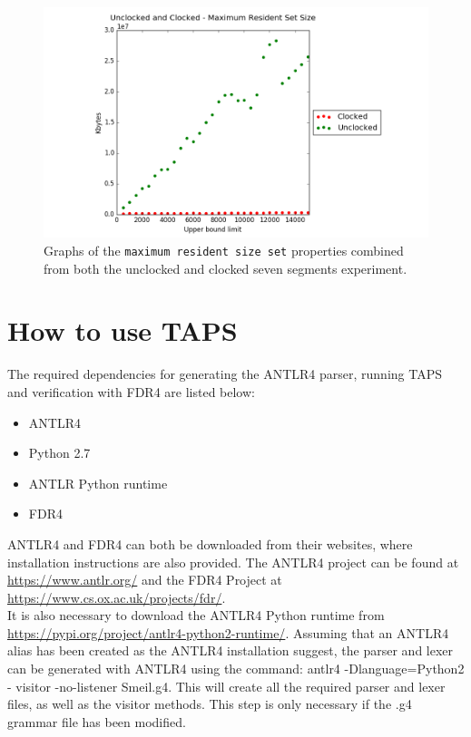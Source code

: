 \begin{figure}
    \centering
    \includegraphics[scale=0.6]{./figures/plots/combined_size.png}
\caption{Graphs of the \texttt{maximum resident size set} properties combined from both the unclocked and clocked seven segments experiment.}
\label{fig:combined_resident_size}
\end{figure}






\newpage
\section{How to use TAPS}
The required dependencies for generating the ANTLR4 parser, running TAPS and verification with FDR4 are listed below:
\begin{itemize}
    \item ANTLR4
    \item Python 2.7
    \item ANTLR Python runtime
    \item FDR4
\end{itemize}

ANTLR4 and FDR4 can both be downloaded from their websites, where installation instructions are also provided.
The ANTLR4 project can be found at \url{https://www.antlr.org/} and the FDR4 Project at \url{https://www.cs.ox.ac.uk/projects/fdr/}.\\
It is also necessary to download the ANTLR4 Python runtime from \url{https://pypi.org/project/antlr4-python2-runtime/}.
Assuming that an ANTLR4 alias has been created as the ANTLR4 installation suggest, the parser and lexer can be generated with ANTLR4 using the command: {\ttfamily antlr4 -Dlanguage=Python2 - visitor -no-listener Smeil.g4.}
This will create all the required parser and lexer files, as well as the visitor methods. This step is only necessary if the .g4 grammar file has been modified.\\

